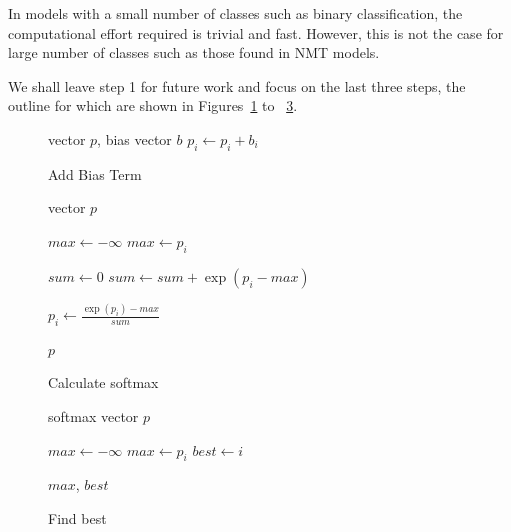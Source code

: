 \documentclass[11pt,a4paper]{article}
\begin{document}
In models with a small number of classes such as binary classification, the computational effort required is trivial and fast. However, this is not the case for large number of classes such as those found in NMT models.

We shall leave step 1 for future work and focus on the last three steps, the outline for which are shown in Figures~\ref{algo:Add Bias Term} to ~\ref{algo:Find best}.

\begin{figure} [h]
\begin{algorithmic}
\REQUIRE vector $p$, bias vector $b$
  \STATE $p_i \gets p_i + b_i$
\ENDFOR 
\end{algorithmic}
\caption{Add Bias Term}
\label{algo:Add Bias Term}
\end{figure}

\begin{figure} [h]
\begin{algorithmic}
\REQUIRE vector $p$


\STATE $max \gets - \infty$ 
    \STATE $max \gets p_i$
  \ENDIF
\ENDFOR 


\STATE $sum \gets 0$ 
  \STATE $sum \gets sum + \exp(p_i - max)$
\ENDFOR 


  \STATE $p_i \gets \frac{\exp(p_i) - max}{sum} $
\ENDFOR 

\RETURN $p$

\end{algorithmic}
\caption{Calculate softmax}
\label{algo:Calculate softmax}
\end{figure}

\begin{figure} [h]
\begin{algorithmic}
\REQUIRE softmax vector $p$

\STATE $max \gets - \infty$ 
    \STATE $max \gets p_i$
    \STATE $best \gets i$
  \ENDIF
\ENDFOR 

\RETURN $max$, $best$

\end{algorithmic}
\caption{Find best}
\label{algo:Find best}
\end{figure}
\end{document}
